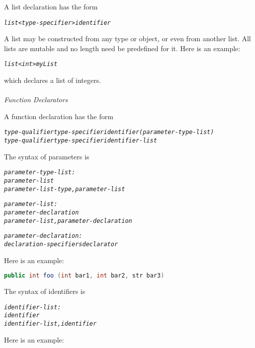 \documentclass[12pt]{report}
\begin{document}
A list declaration has the form

\begin{alltt}
         \textit{list<type-specifier> identifier}
\end{alltt}

A list  may be constructed from any type or object, or even from another list. All lists are mutable and no length need be predefined for it. Here is an example:

\begin{alltt}
         \textit{list<int> myList}
\end{alltt}

which declares a list of integers.\\
\\
\textit{Function Declarators}

A function declaration has the form

\begin{alltt}\begin{singlespace}
    \textit{type-qualifier type-specifier identifier ( parameter-type-list )}
    \textit{type-qualifier type-specifier identifier-list}\end{singlespace}
\end{alltt}
The syntax of parameters is

\begin{alltt}\begin{singlespace}
         \textit{parameter-type-list:}
              \textit{parameter-list}
              \textit{parameter-list-type , parameter-list}
              
         \textit{parameter-list:}
              \textit{parameter-declaration}
              \textit{parameter-list , parameter-declaration}
              
         \textit{parameter-declaration:}
              \textit{declaration-specifiers declarator}\end{singlespace}
\end{alltt}
Here is an example:

\begin{singlespace}
\begin{lstlisting}[language=Java,label=some-code,caption=foo declaration]
public int foo (int bar1, int bar2, str bar3)
\end{lstlisting}
\end{singlespace}
The syntax of identifiers is

\begin{alltt}\begin{singlespace}
         \textit{identifier-list:}
              \textit{identifier}
              \textit{identifier-list , identifier}\end{singlespace}
\end{alltt}
Here is an example:
\end{document}

